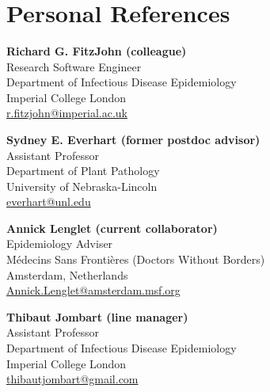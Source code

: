 \documentclass[10pt,letterpaper,sans]{modernresume} %
\title{ } %
\begin{document}


\makecvtitle %



\vspace{5pt}

\section{Personal References}

\vspace{5pt}

\textbf{Richard G. FitzJohn (colleague)}\\
Research Software Engineer\\
Department of Infectious Disease Epidemiology\\
Imperial College London\\
\href{mailto:r.fitzjohn@imperial.ac.uk?subject=Reference for Zhian N. Kamvar}{r.fitzjohn@imperial.ac.uk}

\bigskip

\textbf{Sydney E. Everhart (former postdoc advisor)}\\
Assistant Professor\\
Department of Plant Pathology\\
University of Nebraska-Lincoln\\
\href{mailto:everhart@unl.edu?subject=Reference for Zhian N. Kamvar}{everhart@unl.edu}

\bigskip

\textbf{Annick Lenglet (current collaborator)}\\
Epidemiology Adviser\\
M\'{e}decins Sans Fronti\`{e}res (Doctors Without Borders)\\ 
Amsterdam, Netherlands\\
\href{mailto:Annick.Lenglet@amsterdam.msf.org?subject=Reference for Zhian N. Kamvar}{Annick.Lenglet@amsterdam.msf.org}

\bigskip

\textbf{Thibaut Jombart (line manager)}\\
Assistant Professor\\
Department of Infectious Disease Epidemiology\\
Imperial College London\\
\href{mailto:thibautjombart@gmail.com?subject=Reference for Zhian N. Kamvar}{thibautjombart@gmail.com}
\end{document}
